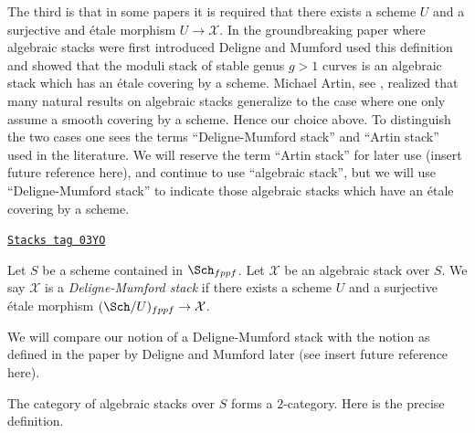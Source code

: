 \medskip\noindent
The third is that in some papers it is required that there exists a
scheme $U$ and a surjective and \'etale morphism $U \to \mathcal{X}$.
In the groundbreaking paper \cite{DM} where algebraic stacks were first
introduced Deligne and Mumford used this definition and showed that
the moduli stack of stable genus $g > 1$ curves is an algebraic stack
which has an \'etale covering by a scheme. Michael Artin, see
\cite{ArtinVersal}, realized that many
natural results on algebraic stacks generalize to the case where one
only assume a smooth covering by a scheme. Hence our choice above.
To distinguish the two cases one sees the terms ``Deligne-Mumford stack''
and ``Artin stack'' used in the literature. We will reserve the term
``Artin stack'' for later use (insert future reference here), and continue
to use ``algebraic stack'', but we will use ``Deligne-Mumford stack''
to indicate those algebraic stacks which have an \'etale covering by a
scheme.

\begin{definition}
\label{algebraic-definition-deligne-mumford}
\href{https://stacks.math.columbia.edu/tag/03YO}{\texttt{Stacks tag 03YO}}

Let $S$ be a scheme contained in $\Sch_{fppf}$.
Let $\mathcal{X}$ be an algebraic stack over $S$.
We say $\mathcal{X}$ is a {\it Deligne-Mumford stack} if there exists
a scheme $U$ and a surjective \'etale morphism
$(\Sch/U)_{fppf} \to \mathcal{X}$.
\end{definition}

We will compare our notion of a Deligne-Mumford stack with
the notion as defined in the paper by Deligne and Mumford later
(see insert future reference here).

\medskip\noindent
The category of algebraic stacks over $S$ forms a $2$-category.
Here is the precise definition.


